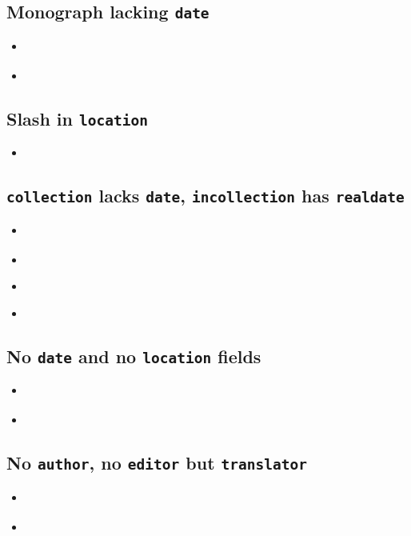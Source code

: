 \documentclass[a4paper,12pt]{scrartcl}
\newcommand*{\Typ}[1]{\texttt{\symbol{64}#1}}
\newcommand*{\Feld}[1]{\texttt{#1}}
\begin{document}
\subsection{Monograph lacking \Feld{date}}
\begin{itemize}
    \item\cite{siebert:u:et:al:o:j}%
    \item{}%
\end{itemize}


\subsection{Slash in \Feld{location}}
\begin{itemize}
    \item{}%
\end{itemize}

\subsection{\Typ{collection} lacks \Feld{date}, \Typ{incollection} has \Feld{realdate}}
\begin{itemize}
    \item\cite{huet:o:j}%
    \item{}%
    \item\cite{mette:1990}%
    \item{}%
\end{itemize}

\subsection{No \Feld{date} and no \Feld{location} fields}
\begin{itemize}
    \item\cite{fuchs:o:j}%
    \item{}%
\end{itemize}

\subsection{No \Feld{author}, no \Feld{editor} but \Feld{translator}}
\begin{itemize}
    \item\cite{sterk:1777}%
    \item{}%
\end{itemize}
\end{document}

